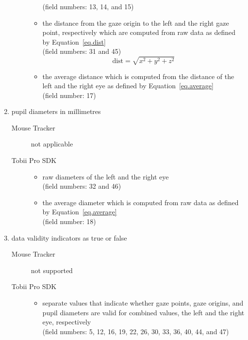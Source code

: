 \documentclass[a4paper,oneside]{book}
\begin{document}
\begin{enumerate}
\begin{description}
\begin{itemize}
                        (field numbers: 13, 14, and 15)
                    \item the distance from the gaze origin to the left and the right gaze point, respectively which are computed from raw data as defined by Equation~\ref{eq.dist}\\
                        (field numbers: 31 and 45)
\begin{equation}
    \label{eq.dist}
    \text{dist} = \sqrt{x^2 + y^2 + z^2}
\end{equation}
                    \item the average distance which is computed from the distance of the left and the right eye as defined by Equation~\ref{eq.average}\\
                        (field number: 17)
                \end{itemize}
        \end{description}
    \item pupil diameters in millimetres
        \begin{description}
            \item[Mouse Tracker] not applicable
            \item[Tobii Pro SDK] \hfill
                \begin{itemize}
                    \item raw diameters of the left and the right eye\\
                        (field numbers: 32 and 46)
                    \item the average diameter which is computed from raw data as defined by Equation~\ref{eq.average}\\
                        (field number: 18)
                \end{itemize}
        \end{description}
    \item data validity indicators as true or false
        \begin{description}
            \item[Mouse Tracker] not supported
            \item[Tobii Pro SDK] \hfill
                \begin{itemize}
                    \item separate values that indicate whether gaze points, gaze origins, and pupil diameters are valid for combined values, the left and the right eye, respectively\\
                        (field numbers: 5, 12, 16, 19, 22, 26, 30, 33, 36, 40, 44, and 47)
                \end{itemize}
        \end{description}
\end{enumerate}
\end{document}
